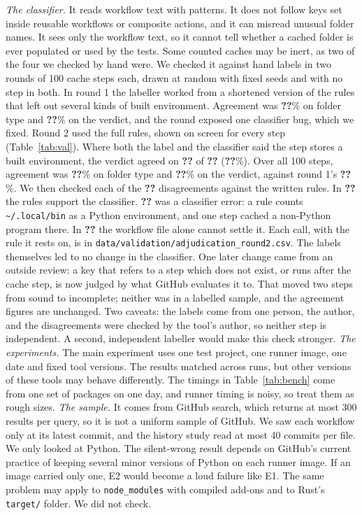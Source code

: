 \documentclass[10pt,a4paper]{article}
\newcommand{\ck}[1]{\textbf{??}}\newcommand{\repourl}{\url{https://github.com/mark124/cache-key-soundness}}%
\begin{document}
\emph{The classifier.} It reads workflow text with patterns. It does not follow
keys set inside reusable workflows or composite actions, and it can misread
unusual folder names. It sees only the workflow text, so it cannot tell whether
a cached folder is ever populated or used by the tests. Some counted caches
may be inert, as two of the four we checked by hand were. We checked it against hand labels in two rounds of 100
cache steps each, drawn at random with fixed seeds and with no step in both.
In round 1 the labeller worked from a shortened version of the rules that left
out several kinds of built environment. Agreement was
\ck{t5r1.path_kind_agreement_pct}\% on folder type and
\ck{t5r1.verdict_agreement_pct}\% on the verdict, and the round exposed one
classifier bug, which we fixed. Round 2 used the full rules, shown on screen
for every step (Table~\ref{tab:val}). Where both the label and the classifier
said the step stores a built environment, the verdict agreed on
\ck{t5.verdict_both_built_env_agree} of \ck{t5.verdict_both_built_env_n}
(\ck{t5.verdict_both_built_env_pct}\%). Over all 100 steps, agreement was
\ck{t5.path_kind_agreement_pct}\% on folder type and
\ck{t5.verdict_agreement_pct}\% on the verdict, against round 1's
\ck{t5r1.verdict_agreement_pct}\%. We
then checked each of the \ck{t5.disagreements_checked} disagreements against
the written rules. In \ck{t5.disagreements_tool_follows_rubric} the rules
support the classifier. \ck{t5.disagreements_classifier_error} was a
classifier error: a rule counts \texttt{\textasciitilde/.local/bin} as a Python
environment, and one step cached a non-Python program there. In
\ck{t5.disagreements_undecidable} the workflow file alone cannot settle it.
Each call, with the rule it rests on, is in
\texttt{data/validation/adjudication\_round2.csv}. The labels themselves led
to no change in the classifier. One later change came from an outside review:
a key that refers to a step which does not exist, or runs after the cache
step, is now judged by what GitHub evaluates it to. That moved two steps
from sound to incomplete; neither was in a labelled sample, and the
agreement figures are unchanged. Two caveats: the labels come from
one person, the author, and the disagreements were checked by the tool's
author, so neither step is independent. A second, independent labeller would
make this check stronger.
\emph{The experiments.} The main experiment uses one test project, one runner
image, one date and fixed tool versions. The results matched across runs, but
other versions of these tools may behave differently. The timings in
Table~\ref{tab:bench} come from one set of packages on one day, and runner
timing is noisy, so treat them as rough sizes. \emph{The sample.} It comes from
GitHub search, which returns at most 300 results per query, so it is not a
uniform sample of GitHub. We saw each workflow only at its latest commit, and
the history study read at most 40 commits per file. We only looked at Python.
The silent-wrong result depends on GitHub's current practice of keeping several
minor versions of Python on each runner image. If an image carried only one,
E2 would become a loud failure like E1.
The same problem may apply to \texttt{node\_modules} with compiled add-ons and
to Rust's \texttt{target/} folder. We did not check.
\end{document}
